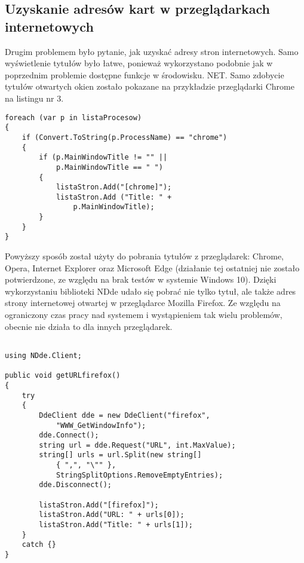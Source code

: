 \subsection{Uzyskanie adresów kart w przeglądarkach internetowych}
Drugim problemem było pytanie, jak uzyskać adresy stron internetowych. Samo wyświetlenie tytułów było łatwe, ponieważ wykorzystano podobnie jak w poprzednim problemie dostępne funkcje w środowisku. NET. Samo zdobycie tytułów otwartych okien zostało pokazane na przykładzie przeglądarki Chrome na listingu nr 3.
\newline
\begin{lstlisting}[frame=single,captionpos=b,
    caption={Fragment kodu odpowiedzialny za pobranie tytułu otwartej strony w przeglądarce Chrome.},
    label={lst:kod1},
    style=sharpc]
foreach (var p in listaProcesow)
{
    if (Convert.ToString(p.ProcessName) == "chrome")
    {
        if (p.MainWindowTitle != "" ||
            p.MainWindowTitle == " ")
        {
            listaStron.Add("[chrome]");
            listaStron.Add ("Title: " + 
                p.MainWindowTitle);
        }
    }
}
\end{lstlisting}

Powyższy sposób został użyty do pobrania tytułów z przeglądarek: Chrome, Opera, Internet Explorer oraz Microsoft Edge (działanie tej ostatniej nie zostało potwierdzone, ze względu na brak testów w systemie Windows 10). Dzięki wykorzystaniu biblioteki NDde udało się pobrać nie tylko tytuł, ale także adres strony internetowej otwartej w przeglądarce Mozilla Firefox. Ze względu na ograniczony czas pracy nad systemem i wystąpieniem tak wielu problemów, obecnie nie działa to dla innych przeglądarek.

\newline



\begin{lstlisting}[frame=single,captionpos=b,
caption                 ={Fragment kodu odpowiedzialny za pobranie adresu URL oraz tytułu otwartej strony w przeglądarce Mozilla Firefox},
label                   ={lst:kod1},
style                   =sharpc]

using NDde.Client;

public void getURLfirefox()
{
    try
    {
        DdeClient dde = new DdeClient("firefox",
            "WWW_GetWindowInfo");
        dde.Connect();
        string url = dde.Request("URL", int.MaxValue);
        string[] urls = url.Split(new string[] 
            { ",", "\"" }, 
            StringSplitOptions.RemoveEmptyEntries);
        dde.Disconnect();
        
        listaStron.Add("[firefox]");
        listaStron.Add("URL: " + urls[0]);
        listaStron.Add("Title: " + urls[1]);
    }
    catch {}
}
\end{lstlisting}

